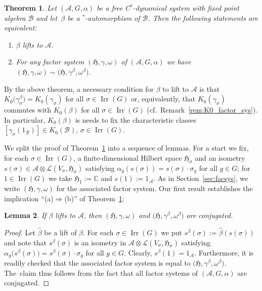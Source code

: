 \documentclass[10pt,a4paper]{amsart}
\numberwithin{equation}{section}
\newtheorem{Theorem}{Theorem}[section]
\newtheorem{Lemma}[Theorem]{Lemma}
\newcommand*{\C}{\mathbb C}		%
\newcommand*{\tensor}{\otimes}		%
\newcommand*{\Star}{$^*$\nobreakdash}
\newcommand*{\hilb}{\mathfrak}		%
\newcommand*{\alg}{\mathcal}		%
\newcommand*{\hH}{\hilb{H}}			%
\newcommand*{\one}{1}				%
\newcommand*{\aA}{\alg{A}}			%
\newcommand*{\aB}{\alg{B}} 			%
\newcommand*{\End}{\mathcal{L}} %
\DeclareMathOperator{\Irrep}{Irr} 			%
\begin{document}
\begin{Theorem}\label{thm:lift_conjugated_factor_sys}
	Let $(\aA, G, \alpha)$ be a free C\Star-dynamical system with fixed point algebra $\aB$ and let~$\beta$ be a \Star-automorphism of $\aB$.
	Then the following statements are equivalent:
	\begin{enumerate}\itemsep=0pt
	\item[$(a)$] $\beta$ lifts to $\aA$.
	\item[$(b)$] For any factor system $(\hH, \gamma, \omega)$ of $(\aA, G, \alpha)$ we have $(\hH, \gamma, \omega) \sim \big(\hH, \gamma^\beta, \omega^\beta\big)$.
	\end{enumerate}
\end{Theorem}

\begin{Remark}
	By the above theorem, a necessary condition for $\beta$ to lift to $\aA$ is that $K_0\big(\gamma_\sigma^\beta\big) = K_0(\gamma_\sigma)$ for all $\sigma \in \Irrep(G)$ or, equivalently, that $K_0(\gamma_\sigma)$ commutes with $K_0(\beta)$ for all $\sigma \in \Irrep(G)$ (cf.~Remark~\ref{rem:K0_factor_sys}).
	In particular, $K_0(\beta)$ is needs to fix the characteristic classes $[\gamma_\sigma(\one_\aB)] \in K_0(\aB)$, $\sigma \in \Irrep(G)$.
\end{Remark}

We split the proof of Theorem~\ref{thm:lift_conjugated_factor_sys} into a sequence of lemmas.
For a start we fix, for each $\sigma \in \Irrep(G)$, a finite-dimensional Hilbert space $\hH_\sigma$ and an isometry $s(\sigma)\in \aA \tensor \End(V_\sigma,\hH_\sigma)$ satisfying $\alpha_g (s(\sigma) )=s(\sigma) \cdot \sigma_g$ for all $g \in G$; for $1 \in \Irrep(G)$ we take $\hH_1 := \C$ and $s(1) := \one_\aA$.
As in Section~\ref{sec:facsys}, we write $(\hH, \gamma, \omega)$ for the associated factor system.
Our first result establishes the implication ``(a)$\Rightarrow$(b)'' of Theorem~\ref{thm:lift_conjugated_factor_sys}:

\begin{Lemma}\label{lem:conjugated}
	If $\beta$ lifts to $\aA$, then $(\hH, \gamma, \omega)$ and $\big(\hH, \gamma^\beta, \omega^\beta\big)$ are conjugated.
\end{Lemma}

\begin{proof}
	Let $\hat \beta$ be a lift of $\beta$.
	For each $\sigma \in \Irrep(G)$ we put $s^\beta(\sigma) := \hat \beta ( s(\sigma) )$ and note that $s^\beta(\sigma)$ is an isometry in $\aA \tensor \End(V_\sigma,\hH_\sigma)$ satisfying $\alpha_g\big(s^\beta(\sigma)\big)=s^\beta(\sigma) \cdot \sigma_g$ for all $g \in G$.
	Clearly, $s^\beta(1) = \one_\aA$.
	Furthermore, it is readily checked that the associated factor system is equal to $\big(\hH, \gamma^\beta, \omega^\beta\big)$.
	The~claim thus follows from the fact that all factor systems of $(\aA, G, \alpha)$ are conjugated.
\end{proof}
\end{document}
